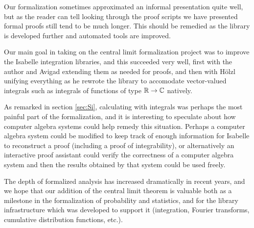 \documentclass{article}
\theoremstyle{definition}
\begin{document}
Our formalization sometimes approximated an informal presentation quite well, but as the reader can tell looking through the proof scripts we have presented formal proofs still tend to be much longer. This should be remedied as the library is developed further and automated tools are improved.

Our main goal in taking on the central limit formalization project was to improve the Isabelle integration libraries, and this succeeded very well, first with the author and Avigad extending them as needed for proofs, and then with H\"olzl unifying everything as he rewrote the library to accomodate vector-valued integrals such as integrals of functions of type $\mathbb{R} \rightarrow \mathbb{C}$ natively.

As remarked in section \ref{sec:Si}, calculating with integrals was perhaps the most painful part of the formalization, and it is interesting to speculate about how computer algebra systems could help remedy this situation. Perhaps a computer algebra system could be modified to keep track of enough information for Isabelle to reconstruct a proof (including a proof of integrability), or alternatively an interactive proof assistant could verify the correctness of a computer algebra system and then the results obtained by that system could be used freely.

The depth of formalized analysis has increased dramatically in recent years, and we hope that our addition of the central limit theorem is valuable both as a milestone in the formalization of probability and statistics, and for the library infrastructure which was developed to support it (integration, Fourier transforms, cumulative distribution functions, etc.).



\end{document}
